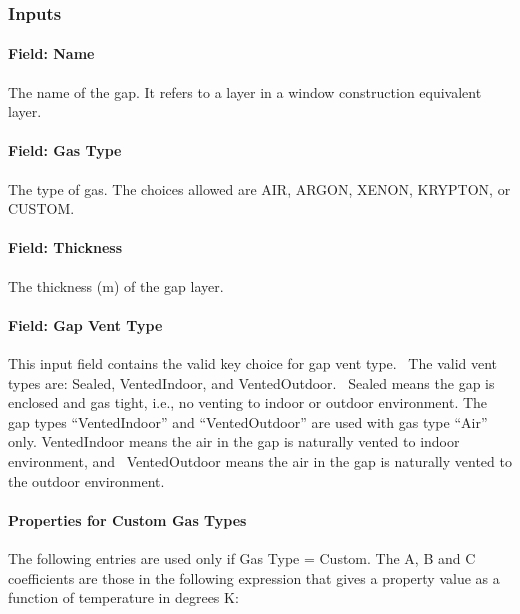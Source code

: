 \subsubsection{Inputs}\label{inputs-31-001}

\paragraph{Field: Name}\label{field-name-25-002}

The name of the gap. It refers to a layer in a window construction equivalent layer.

\paragraph{Field: Gas Type}\label{field-gas-type-1}

The type of gas. The choices allowed are AIR, ARGON, XENON, KRYPTON, or CUSTOM.

\paragraph{Field: Thickness}\label{field-thickness-8}

The thickness (m) of the gap layer.

\paragraph{Field: Gap Vent Type}\label{field-gap-vent-type}

This input field contains the valid key choice for gap vent type.~ The valid vent types are: Sealed, VentedIndoor, and VentedOutdoor.~ Sealed means the gap is enclosed and gas tight, i.e., no venting to indoor or outdoor environment. The gap types ``VentedIndoor'' and ``VentedOutdoor'' are used with gas type ``Air'' only. VentedIndoor means the air in the gap is naturally vented to indoor environment, and~ VentedOutdoor means the air in the gap is naturally vented to the outdoor environment.

\paragraph{Properties for Custom Gas Types}\label{properties-for-custom-gas-types-1}

The following entries are used only if Gas Type = Custom. The A, B and C coefficients are those in the following expression that gives a property value as a function of temperature in degrees K:

